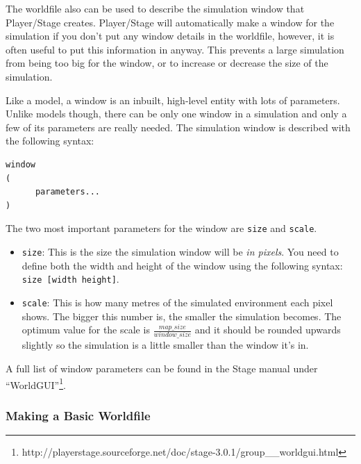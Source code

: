 \documentclass[a4paper]{report}
\newcommand{\plst}{Player/Stage\xspace}
\begin{document}
The worldfile also can be used to describe the simulation window that \plst creates. \plst will automatically make a window for the simulation if you don't put any window details in the worldfile, however, it is often useful to put this information in anyway. This prevents a large simulation from being too big for the window, or to increase or decrease the size of the simulation.

Like a model, a window is an inbuilt, high-level entity with lots of parameters. Unlike models though, there can be only one window in a simulation and only a few of its parameters are really needed. The simulation window is described with the following syntax:
\begin{verbatim}
window
(
      parameters...
)
\end{verbatim}

The two most important parameters for the window are \verb|size| and \verb|scale|.
\begin{itemize}
\item \verb|size|: This is the size the simulation window will be \emph{in pixels}. You need to define both the width and height of the window using the following syntax: \verb|size [width height]|. 
\item \verb|scale|: This is how many metres of the simulated environment each pixel shows. The bigger this number is, the smaller the simulation becomes. The optimum value for the scale is $\frac{map\_size}{window\_size}$ and it should be rounded upwards slightly so the simulation is a little smaller than the window it's in. 
\end{itemize}

A full list of window parameters can be found in the Stage manual under ``WorldGUI''\footnote{http://playerstage.sourceforge.net/doc/stage-3.0.1/group\_\_worldgui.html}.

\subsubsection{Making a Basic Worldfile}\label{sec:basicWorldfile}
\end{document}

